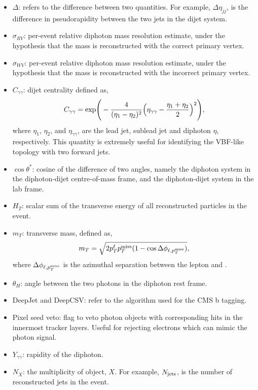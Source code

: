 \begin{itemize}
    \item $\Delta$: refers to the difference between two quantities. For example, $\Delta\eta_{jj}$, is the difference in pseudorapidity between the two jets in the dijet system.
    \item $\sigma_{RV}$: per-event relative diphoton mass resolution estimate, under the hypothesis that the mass is reconstructed with the correct primary vertex. 
    \item $\sigma_{WV}$: per-event relative diphoton mass resolution estimate, under the hypothesis that the mass is reconstructed with the incorrect primary vertex.
    \item $C_{\gamma\gamma}$: dijet centrality defined as,
    \begin{equation}
        C_{\gamma\gamma} = {\rm{exp}} \Bigg( - \frac{4}{(\eta_1-\eta_2)^2} \Big( \eta_{\gamma\gamma} - \frac{\eta_1+\eta_2}{2} \Big)^2 \Bigg),
    \end{equation}
    \noindent
    where $\eta_1$, $\eta_2$, and $\eta_{\gamma\gamma}$, are the lead jet, sublead jet and diphoton $\eta$, respectively. This quantity is extremely useful for identifying the VBF-like topology with two forward jets.
    \item $\cos{\theta^*}$: cosine of the difference of two angles, namely the diphoton system in the diphoton-dijet centre-of-mass frame, and the diphoton-dijet system in the lab frame.
    \item $H_T$: scalar sum of the transverse energy of all reconstructed particles in the event.
    \item $m_T$: transverse mass, defined as,
    \begin{equation}
        m_T = \sqrt{2p_T^\ell p^\textrm{miss}_{T}(1-\cos{\Delta\phi_{\ell,\ensuremath{p^\textrm{miss}_{T}}}})},
    \end{equation}
    \noindent
    where $\Delta\phi_{\ell,p^\textrm{miss}_{T}}$ is the azimuthal separation between the lepton and \met.
    \item $\theta_H$: angle between the two photons in the diphoton rest frame.
    \item DeepJet and DeepCSV: refer to the algorithm used for the CMS b tagging.
    \item Pixel seed veto: flag to veto photon objects with corresponding hits in the innermost tracker layers. Useful for rejecting electrons which can mimic the photon signal.
    \item $Y_{\gamma\gamma}$: rapidity of the diphoton.
    \item $N_{X}$: the multiplicity of object, $X$. For example, $N_{\rm{jets}}$, is the number of reconstructed jets in the event.

\end{itemize}
